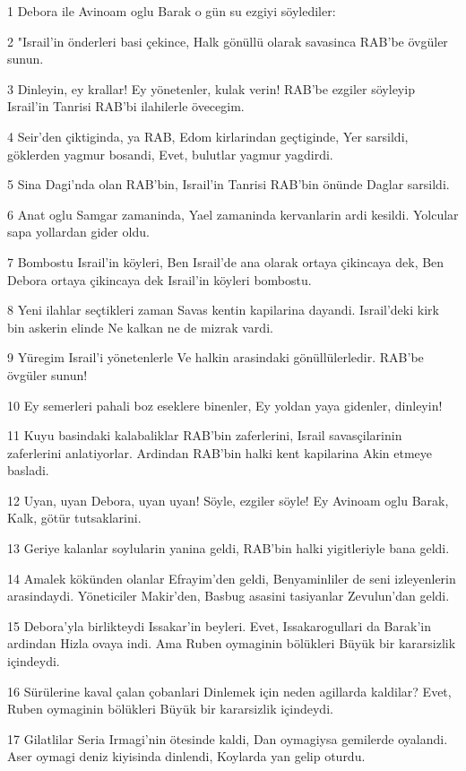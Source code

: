\par 1 Debora ile Avinoam oglu Barak o gün su ezgiyi söylediler:
\par 2 "Israil'in önderleri basi çekince, Halk gönüllü olarak savasinca RAB'be övgüler sunun.
\par 3 Dinleyin, ey krallar! Ey yönetenler, kulak verin! RAB'be ezgiler söyleyip Israil'in Tanrisi RAB'bi ilahilerle övecegim.
\par 4 Seir'den çiktiginda, ya RAB, Edom kirlarindan geçtiginde, Yer sarsildi, göklerden yagmur bosandi, Evet, bulutlar yagmur yagdirdi.
\par 5 Sina Dagi'nda olan RAB'bin, Israil'in Tanrisi RAB'bin önünde Daglar sarsildi.
\par 6 Anat oglu Samgar zamaninda, Yael zamaninda kervanlarin ardi kesildi. Yolcular sapa yollardan gider oldu.
\par 7 Bombostu Israil'in köyleri, Ben Israil'de ana olarak ortaya çikincaya dek, Ben Debora ortaya çikincaya dek Israil'in köyleri bombostu.
\par 8 Yeni ilahlar seçtikleri zaman Savas kentin kapilarina dayandi. Israil'deki kirk bin askerin elinde Ne kalkan ne de mizrak vardi.
\par 9 Yüregim Israil'i yönetenlerle Ve halkin arasindaki gönüllülerledir. RAB'be övgüler sunun!
\par 10 Ey semerleri pahali boz eseklere binenler, Ey yoldan yaya gidenler, dinleyin!
\par 11 Kuyu basindaki kalabaliklar RAB'bin zaferlerini, Israil savasçilarinin zaferlerini anlatiyorlar. Ardindan RAB'bin halki kent kapilarina Akin etmeye basladi.
\par 12 Uyan, uyan Debora, uyan uyan! Söyle, ezgiler söyle! Ey Avinoam oglu Barak, Kalk, götür tutsaklarini.
\par 13 Geriye kalanlar soylularin yanina geldi, RAB'bin halki yigitleriyle bana geldi.
\par 14 Amalek kökünden olanlar Efrayim'den geldi, Benyaminliler de seni izleyenlerin arasindaydi. Yöneticiler Makir'den, Basbug asasini tasiyanlar Zevulun'dan geldi.
\par 15 Debora'yla birlikteydi Issakar'in beyleri. Evet, Issakarogullari da Barak'in ardindan Hizla ovaya indi. Ama Ruben oymaginin bölükleri Büyük bir kararsizlik içindeydi.
\par 16 Sürülerine kaval çalan çobanlari Dinlemek için neden agillarda kaldilar? Evet, Ruben oymaginin bölükleri Büyük bir kararsizlik içindeydi.
\par 17 Gilatlilar Seria Irmagi'nin ötesinde kaldi, Dan oymagiysa gemilerde oyalandi. Aser oymagi deniz kiyisinda dinlendi, Koylarda yan gelip oturdu.
